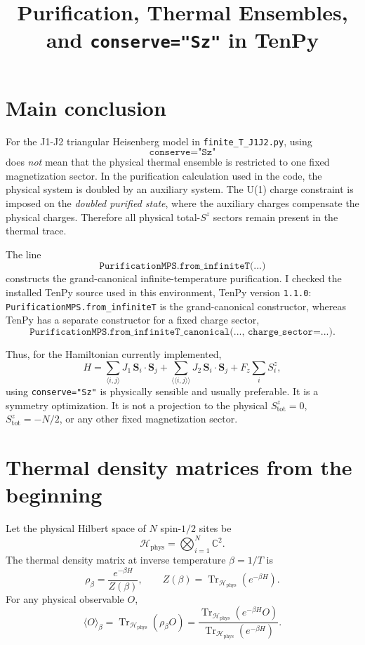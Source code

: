 \documentclass[11pt]{article}
\title{Purification, Thermal Ensembles, and \texttt{conserve="Sz"} in TenPy}
\author{}
\date{}
\newcommand{\Tr}{\operatorname{Tr}}
\newcommand{\Hphys}{\mathcal{H}_{\mathrm{phys}}}
\newcommand{\Sz}{S^z}
\begin{document}
\maketitle

\section*{Main conclusion}

For the J1-J2 triangular Heisenberg model in \texttt{finite\_T\_J1J2.py},
using
\[
\texttt{conserve="Sz"}
\]
does \emph{not} mean that the physical thermal ensemble is restricted to one
fixed magnetization sector. In the purification calculation used in the code,
the physical system is doubled by an auxiliary system. The U(1) charge constraint
is imposed on the \emph{doubled purified state}, where the auxiliary charges
compensate the physical charges. Therefore all physical total-\(\Sz\) sectors
remain present in the thermal trace.

The line
\[
\texttt{PurificationMPS.from\_infiniteT(...)}
\]
constructs the grand-canonical infinite-temperature purification. I checked the
installed TenPy source used in this environment, TenPy version \texttt{1.1.0}:
\texttt{PurificationMPS.from\_infiniteT} is the grand-canonical constructor,
whereas TenPy has a separate constructor for a fixed charge sector,
\[
\texttt{PurificationMPS.from\_infiniteT\_canonical(..., charge\_sector=...)}.
\]

Thus, for the Hamiltonian currently implemented,
\[
H
= \sum_{\langle i,j\rangle} J_1\, \bm S_i\cdot \bm S_j
+ \sum_{\langle\langle i,j\rangle\rangle} J_2\, \bm S_i\cdot \bm S_j
+ F_z \sum_i S_i^z,
\]
using \texttt{conserve="Sz"} is physically sensible and usually preferable.
It is a symmetry optimization. It is not a projection to the physical
\(S^z_{\mathrm{tot}}=0\), \(S^z_{\mathrm{tot}}=-N/2\), or any other fixed
magnetization sector.

\section{Thermal density matrices from the beginning}

Let the physical Hilbert space of \(N\) spin-\(1/2\) sites be
\[
\Hphys = \bigotimes_{i=1}^N \mathbb{C}^2.
\]
The thermal density matrix at inverse temperature \(\beta = 1/T\) is
\[
\rho_\beta
= \frac{e^{-\beta H}}{Z(\beta)},
\qquad
Z(\beta) = \Tr_{\Hphys}\left(e^{-\beta H}\right).
\]
For any physical observable \(O\),
\[
\langle O\rangle_\beta
= \Tr_{\Hphys}(\rho_\beta O)
= \frac{\Tr_{\Hphys}\left(e^{-\beta H}O\right)}
        {\Tr_{\Hphys}\left(e^{-\beta H}\right)}.
\]
\end{document}
